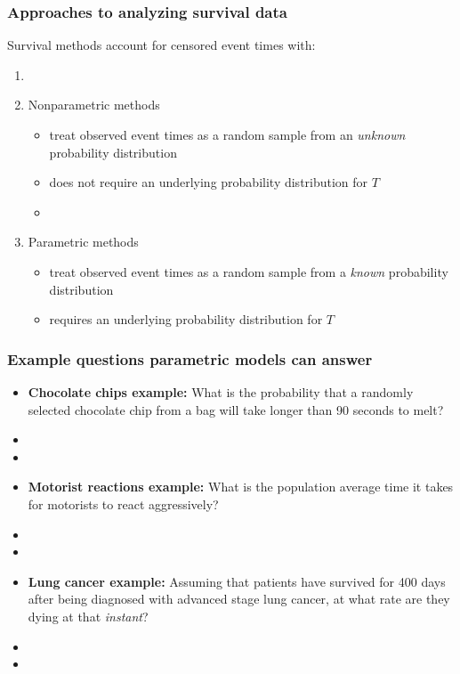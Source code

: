 \begin{frame}
\frametitle{Approaches to analyzing survival data}
Survival methods account for censored event times with:
\begin{enumerate}
\item[]
\item Nonparametric methods
\begin{itemize}
\item treat observed event times as a random sample from an \emph{unknown} probability distribution
\item does not require an underlying probability distribution for $T$
\item[]
\end{itemize}
\item Parametric methods
\begin{itemize}
\item treat observed event times as a random sample from a \emph{known} probability distribution
\item requires an underlying probability distribution for $T$
\end{itemize}
\end{enumerate}
\end{frame}


\begin{frame}
\frametitle{Example questions parametric models can answer}
\begin{itemize}
\item \textbf{Chocolate chips example:} What is the probability that a randomly selected chocolate chip from a bag will take longer than 90 seconds to melt?
\item[] %
\item[]
\item \textbf{Motorist reactions example:} What is the population average time it takes for motorists to react aggressively?
\item[] %
\item[]
\item \textbf{Lung cancer example:} Assuming that patients have survived for 400 days after being diagnosed with advanced stage lung cancer, at what rate are they dying at that \textit{instant}?
\item[] %
\item[]
\end{itemize}
\end{frame}

